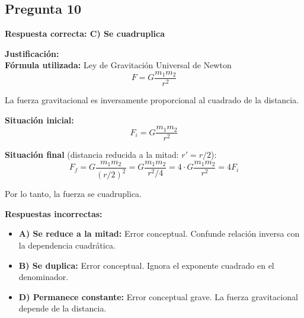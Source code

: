 \begin{respuestabox}

\subsection{Pregunta 10}
\textcolor{verdecorrecto}{\textbf{Respuesta correcta: C) Se cuadruplica}}

\textbf{Justificación:}\\
\textbf{Fórmula utilizada:} Ley de Gravitación Universal de Newton
$$F = G\frac{m_1 m_2}{r^2}$$

La fuerza gravitacional es inversamente proporcional al cuadrado de la distancia.

\textbf{Situación inicial:}
$$F_i = G\frac{m_1 m_2}{r^2}$$

\textbf{Situación final} (distancia reducida a la mitad: $r' = r/2$):
$$F_f = G\frac{m_1 m_2}{(r/2)^2} = G\frac{m_1 m_2}{r^2/4} = 4 \cdot G\frac{m_1 m_2}{r^2} = 4F_i$$

Por lo tanto, la fuerza se cuadruplica.

\textbf{Respuestas incorrectas:}
\begin{itemize}
    \item \textbf{A) Se reduce a la mitad:} Error conceptual. Confunde relación inversa con la dependencia cuadrática.
    \item \textbf{B) Se duplica:} Error conceptual. Ignora el exponente cuadrado en el denominador.
    \item \textbf{D) Permanece constante:} Error conceptual grave. La fuerza gravitacional depende de la distancia.
\end{itemize}
\end{respuestabox}